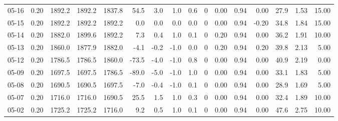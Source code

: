 \begin{threeparttable}
{\begin{tabular}{lrrrrrrrrrrrrrrr}
  05-16 &     0.20 & 1892.2 & 1892.2 & 1837.8 &       54.5 &            3.0 &                      1.0 &                 0.6 &              0 &       0.00 &      0.94 &           0.00 &             27.9 &            1.53 &                  15.00 \\
  05-15 &     0.20 & 1892.2 & 1892.2 & 1892.2 &        0.0 &            0.0 &                      0.0 &                 0.0 &              0 &       0.00 &      0.94 &          -0.20 &             34.8 &            1.84 &                  15.00 \\
  05-14 &     0.20 & 1882.0 & 1899.6 & 1892.2 &        7.3 &            0.4 &                      1.0 &                 0.1 &              0 &       0.20 &      0.94 &           0.00 &             36.2 &            1.91 &                  10.00 \\
  05-13 &     0.20 & 1860.0 & 1877.9 & 1882.0 &       -4.1 &           -0.2 &                     -1.0 &                 0.0 &              0 &       0.20 &      0.94 &           0.20 &             39.8 &            2.13 &                   5.00 \\
  05-12 &     0.20 & 1786.5 & 1786.5 & 1860.0 &      -73.5 &           -4.0 &                     -1.0 &                 0.8 &              0 &       0.00 &      0.94 &           0.00 &             40.9 &            2.19 &                   0.00 \\
  05-09 &     0.20 & 1697.5 & 1697.5 & 1786.5 &      -89.0 &           -5.0 &                     -1.0 &                 1.0 &              0 &       0.00 &      0.94 &           0.00 &             33.1 &            1.83 &                   5.00 \\
  05-08 &     0.20 & 1690.5 & 1690.5 & 1697.5 &       -7.0 &           -0.4 &                     -1.0 &                 0.1 &              0 &       0.00 &      0.94 &           0.00 &             28.9 &            1.69 &                   5.00 \\
  05-07 &     0.20 & 1716.0 & 1716.0 & 1690.5 &       25.5 &            1.5 &                      1.0 &                 0.3 &              0 &       0.00 &      0.94 &           0.00 &             32.4 &            1.89 &                  10.00 \\
  05-02 &     0.20 & 1725.2 & 1725.2 & 1716.0 &        9.2 &            0.5 &                      1.0 &                 0.1 &              0 &       0.00 &      0.94 &           0.00 &             47.6 &            2.75 &                  10.00 \\

\end{tabular}}
\end{threeparttable}
